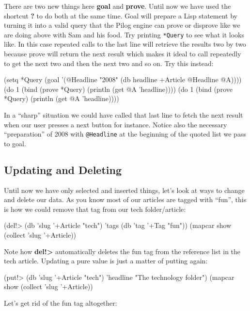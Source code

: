There are two new things here \textbf{goal} and \textbf{prove}. Until
now we have used the shortcut \textbf{?} to do both at the same time.
Goal will prepare a Lisp statement by turning it into a valid query
that the Pilog engine can prove or disprove like we are doing above
with Sam and his food. Try printing \texttt{*Query} to see what it
looks like. In this case repeated calls to the last line will retrieve
the results two by two because prove will return the next result which
makes it ideal to call repeatedly to get the next two and then the
next two and so on. Try this instead:


\begin{wideverbatim}
(setq *Query (goal '(@Headline "2008" (db headline +Article @Headline @A))))
(do 1 (bind (prove *Query) (println (get @A 'headline))))
(do 1 (bind (prove *Query) (println (get @A 'headline))))
\end{wideverbatim}

In a ``sharp'' situation we could have called that last line to fetch
the next result when our user presses a next button for instance.
Notice also the necessary ``preparation'' of 2008 with
\texttt{@Headline} at the beginning of the quoted list we pass to
goal.

\subsection{Updating and Deleting}
\label{sec:advanced-oodb}

Until now we have only selected and inserted things, let's look at ways
to change and delete our data. As you know most of our articles are
tagged with ``fun'', this is how we could remove that tag from our tech
folder/article:


\begin{wideverbatim}
(del!> (db 'slug '+Article "tech") 'tags (db 'tag '+Tag "fun"))
(mapcar show (collect 'slug '+Article))
\end{wideverbatim}

Note how \textbf{del!\textgreater} automatically deletes the fun tag from the reference
list in the tech article. Updating a pure value is just a matter of
putting again:


\begin{wideverbatim}
(put!> (db 'slug '+Article "tech") 'headline "The technology folder")
(mapcar show (collect 'slug '+Article))
\end{wideverbatim}

Let's get rid of the fun tag altogether:


